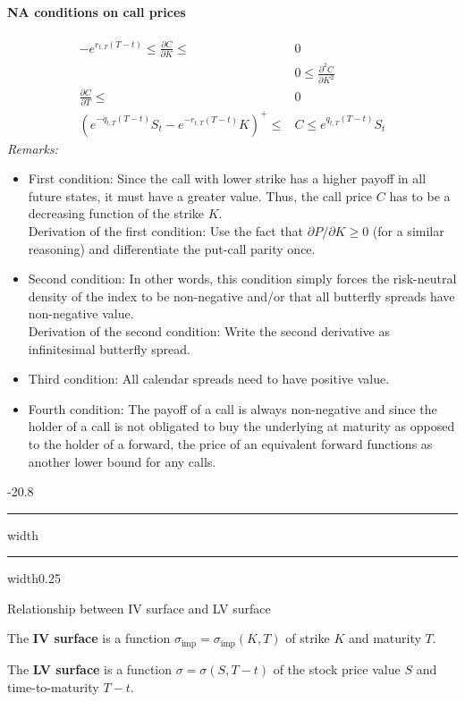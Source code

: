 \documentclass[a4paper,landscape,7pt,fleqn]{scrartcl}
\makeatletter
\renewcommand{\emph}[1]{\textbf{#1}}
\renewcommand{\subsection}{\@startsection{subsection}{1}{0mm}%
{-2\baselineskip}{0.8\baselineskip}%
{\hrule depth 0.2pt width\columnwidth\hrule depth0.75pt
width0.25\columnwidth\vspace*{1.2em}\large\bfseries}}
\makeatother
\begin{document}
\begin{multicols*}{3}
\paragraph{NA conditions on call prices}
\begin{align*}
-e^{r_{t,T} (T-t)} \leq \frac{\partial C}{\partial K} \leq &0 \\
&0 \leq \frac{\partial^2 C}{\partial K^2} \\
\frac{\partial C}{\partial T} \leq &0 \\
\left( e^{-q_{t,T}(T-t)} S_t - e^{-r_{t,T}(T-t)} K \right)^+ \leq &C \leq e^{q_{t,T}(T-t)} S_t
\end{align*}
\textit{Remarks:}
\begin{itemize}
\item First condition: Since the call with lower strike has a higher payoff in all future states, it must have a greater value. Thus, the call price $C$ has to be a decreasing function of the strike $K$. \\
Derivation of the first condition: Use the fact that $\partial P/\partial K \geq 0$ (for a similar reasoning) and differentiate the put-call parity once.
\item Second condition: In other words, this condition simply forces the risk-neutral density of the index to be non-negative and/or that all butterfly spreads have non-negative value. \\
Derivation of the second condition: Write the second derivative as infinitesimal butterfly spread.
\item Third condition: All calendar spreads need to have positive value.
\item Fourth condition: The payoff of a call is always non-negative and since the holder of a call is not obligated to buy the underlying at maturity as opposed to the holder of a forward, the price of an equivalent forward functions as another lower bound for any calls.
\end{itemize}

\subsection{Relationship between IV surface and LV surface}

The \emph{IV surface} is a function $\sigma_{\text{imp}} = \sigma_{\text{imp}}(K,T)$ of strike $K$ and maturity $T$.

The \emph{LV surface} is a function $\sigma = \sigma(S,T-t)$ of the stock price value $S$ and time-to-maturity $T-t$.


\end{multicols*}
\end{document}
